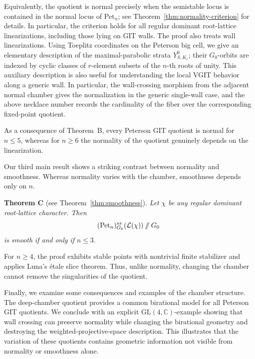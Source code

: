 \documentclass[12pt, reqno]{amsart}
\newcommand{\sslash}{\mathbin{/\mkern-6mu/}}
\theoremstyle{plain}
\numberwithin{equation}{section}
\theoremstyle{definition}
\begin{document}
Equivalently, the quotient is normal precisely when the semistable
locus is contained in the normal locus of \(\mathrm{Pet}_n\); see
Theorem~\ref{thm:normality-criterion} for details. In particular, the criterion
holds for all regular dominant root-lattice linearizations, including
those lying on GIT walls. The proof also treats wall linearizations. Using Toeplitz
coordinates on the Peterson big cell, we give an elementary
description of the maximal-parabolic strata \(Y^0_{S,K_r}\);
their \(G_0\)-orbits are indexed by cyclic classes of
\(r\)-element subsets of the \(n\)-th roots of unity. 
This auxiliary description is also useful for understanding the
local VGIT behavior along a generic wall. In particular, the
wall-crossing morphism from the adjacent normal chamber gives the
normalization in the generic single-wall case, and the above necklace
number records the cardinality of the fiber over the corresponding
fixed-point quotient.

As a consequence of Theorem~B, every Peterson GIT quotient is normal
for \(n\le5\), whereas for \(n\ge6\) the normality of the quotient
genuinely depends on the linearization.

Our third main result shows a striking contrast between normality and
smoothness. Whereas normality varies with the chamber, smoothness
depends only on \(n\).

\noindent\textbf{Theorem C} (see Theorem~\ref{thm:smoothness}). 
\emph{Let \(\chi\) be any regular dominant root-lattice character.
Then
\[
(\mathrm{Pet}_n)^{ss}_{G_0}(\mathcal L(\chi))
\sslash G_0
\]
is smooth if and only if $n\le3.$}

For \(n\ge4\), the proof exhibits stable points with nontrivial
finite stabilizer and applies Luna's \'etale slice theorem. Thus, unlike
normality, changing the chamber cannot remove the singularities of
the quotient.

Finally, we examine some consequences and examples of the chamber
structure. The deep-chamber quotient provides a common birational
model for all Peterson GIT quotients. We conclude with an explicit \(\mathrm{GL}(4,\mathbb C)\)-example showing that
wall crossing can preserve normality while changing the birational
geometry and destroying the weighted-projective-space description. This illustrates that the
variation of these quotients contains geometric information not
visible from normality or smoothness alone.
\end{document}
